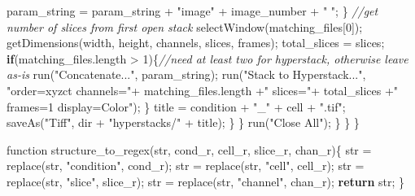 \documentclass[
  12pt,
  a4paper,
]{book}
\newenvironment{Shaded}{}{}
\newcommand{\CommentTok}[1]{\textcolor[rgb]{0.38,0.63,0.69}{\textit{#1}}}
\newcommand{\ControlFlowTok}[1]{\textcolor[rgb]{0.00,0.44,0.13}{\textbf{#1}}}
\newcommand{\DecValTok}[1]{\textcolor[rgb]{0.25,0.63,0.44}{#1}}
\newcommand{\NormalTok}[1]{#1}
\newcommand{\OperatorTok}[1]{\textcolor[rgb]{0.40,0.40,0.40}{#1}}
\newcommand{\StringTok}[1]{\textcolor[rgb]{0.25,0.44,0.63}{#1}}
\begin{document}
\begin{Shaded}
\begin{Highlighting}[]
\NormalTok{                        param\_string }\OperatorTok{=}\NormalTok{ param\_string }\OperatorTok{+} \StringTok{"image"} \OperatorTok{+}\NormalTok{ image\_number }\OperatorTok{+} \StringTok{" "}\OperatorTok{;}
                    \OperatorTok{\}}
                    \CommentTok{//get number of slices from first open stack}
\NormalTok{                    selectWindow}\OperatorTok{(}\NormalTok{matching\_files}\OperatorTok{[}\DecValTok{0}\OperatorTok{]);}
\NormalTok{                    getDimensions}\OperatorTok{(}\NormalTok{width}\OperatorTok{,}\NormalTok{ height}\OperatorTok{,}\NormalTok{ channels}\OperatorTok{,}\NormalTok{ slices}\OperatorTok{,}\NormalTok{ frames}\OperatorTok{);}
\NormalTok{                    total\_slices }\OperatorTok{=}\NormalTok{ slices}\OperatorTok{;}
                    \ControlFlowTok{if}\OperatorTok{(}\NormalTok{matching\_files}\OperatorTok{.}\NormalTok{length }\OperatorTok{\textgreater{}} \DecValTok{1}\OperatorTok{)\{}\CommentTok{//need at least two for hyperstack, otherwise leave as{-}is}
\NormalTok{                        run}\OperatorTok{(}\StringTok{"Concatenate..."}\OperatorTok{,}\NormalTok{ param\_string}\OperatorTok{);}
\NormalTok{                        run}\OperatorTok{(}\StringTok{"Stack to Hyperstack..."}\OperatorTok{,} \StringTok{"order=xyzct channels="}\OperatorTok{+}\NormalTok{ matching\_files}\OperatorTok{.}\NormalTok{length }\OperatorTok{+}\StringTok{" slices="}\OperatorTok{+}\NormalTok{ total\_slices }\OperatorTok{+}\StringTok{" frames=1 display=Color"}\OperatorTok{);}
                    \OperatorTok{\}}
\NormalTok{                    title }\OperatorTok{=}\NormalTok{ condition }\OperatorTok{+} \StringTok{"\_"} \OperatorTok{+}\NormalTok{ cell }\OperatorTok{+} \StringTok{".tif"}\OperatorTok{;}
\NormalTok{                    saveAs}\OperatorTok{(}\StringTok{"Tiff"}\OperatorTok{,}\NormalTok{ dir }\OperatorTok{+} \StringTok{"hyperstacks/"} \OperatorTok{+}\NormalTok{ title}\OperatorTok{);}
                \OperatorTok{\}}
            \OperatorTok{\}}           
\NormalTok{            run}\OperatorTok{(}\StringTok{"Close All"}\OperatorTok{);}
        \OperatorTok{\}}
    \OperatorTok{\}}
\OperatorTok{\}}

\NormalTok{function structure\_to\_regex}\OperatorTok{(}\NormalTok{str}\OperatorTok{,}\NormalTok{ cond\_r}\OperatorTok{,}\NormalTok{ cell\_r}\OperatorTok{,}\NormalTok{ slice\_r}\OperatorTok{,}\NormalTok{ chan\_r}\OperatorTok{)\{}
\NormalTok{    str }\OperatorTok{=}\NormalTok{ replace}\OperatorTok{(}\NormalTok{str}\OperatorTok{,} \StringTok{"condition"}\OperatorTok{,}\NormalTok{ cond\_r}\OperatorTok{);}
\NormalTok{    str }\OperatorTok{=}\NormalTok{ replace}\OperatorTok{(}\NormalTok{str}\OperatorTok{,} \StringTok{"cell"}\OperatorTok{,}\NormalTok{ cell\_r}\OperatorTok{);}
\NormalTok{    str }\OperatorTok{=}\NormalTok{ replace}\OperatorTok{(}\NormalTok{str}\OperatorTok{,} \StringTok{"slice"}\OperatorTok{,}\NormalTok{ slice\_r}\OperatorTok{);}
\NormalTok{    str }\OperatorTok{=}\NormalTok{ replace}\OperatorTok{(}\NormalTok{str}\OperatorTok{,} \StringTok{"channel"}\OperatorTok{,}\NormalTok{ chan\_r}\OperatorTok{);}
    \ControlFlowTok{return}\NormalTok{ str}\OperatorTok{;}
\OperatorTok{\}}


\end{Highlighting}
\end{Shaded}
\end{document}
